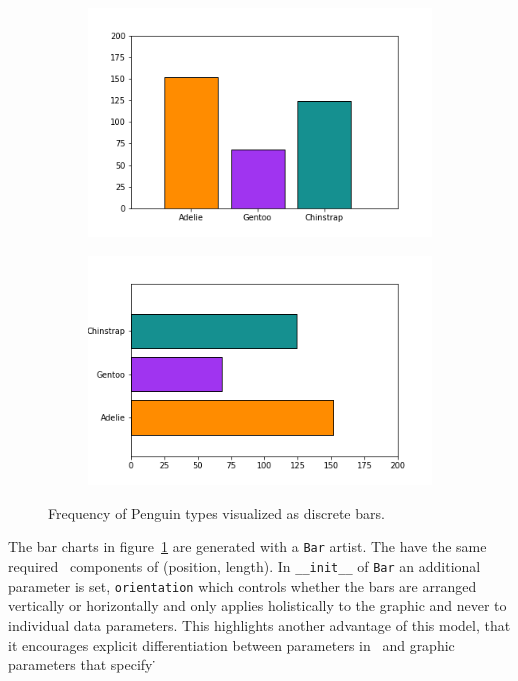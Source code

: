 \documentclass[../main.tex]{subfiles}
\begin{document}
\begin{figure}[H]
    \begin{subfigure}{0.5\textwidth}
        \includegraphics[width=\textwidth]{figures/code/bar_v.png}
    \end{subfigure}
    \begin{subfigure}{0.5\textwidth}
        \includegraphics[width=\textwidth]{figures/code/bar_h.png}
    \end{subfigure}
    \caption{Frequency of Penguin types visualized as discrete bars. }
    \label{fig:code_bar_simple}
\end{figure}
The bar charts in figure~\ref{fig:code_bar_simple} are generated with a \texttt{Bar} artist. The have the same required \vfiber\ components of (position, length). In \texttt{__init__} of \texttt{Bar} an additional parameter is set, \texttt{orientation} which controls whether the bars are arranged vertically or horizontally and only applies holistically to the graphic and never to individual data parameters. This highlights another advantage of this model, that it encourages explicit differentiation between parameters in \vtotal\ and graphic parameters that specify \vmarkd\.
\end{document}
